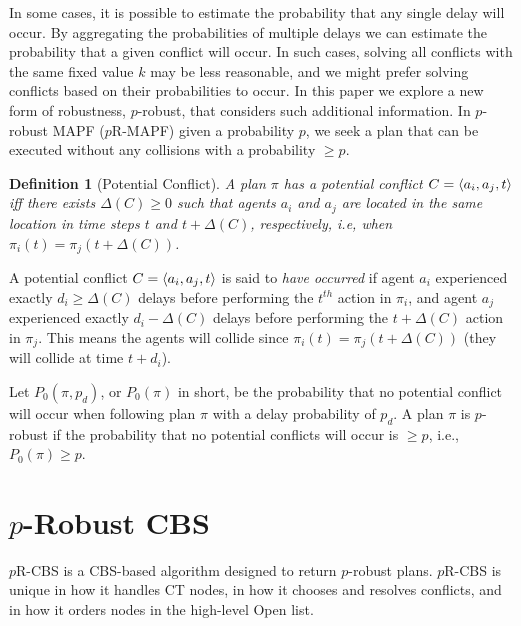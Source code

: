 \documentclass{article}
\newcommand{\prcbs}{$p$R-CBS\xspace}
\newcommand{\prmapf}{$p$R-MAPF\xspace}
\newtheorem{definition}{Definition}
\begin{document}
In some cases, it is possible to estimate the probability that any single delay will occur. By aggregating the probabilities of multiple delays we can estimate the probability that a given conflict will occur. In such cases, solving all conflicts with the same fixed value $k$ may be less reasonable, and we might prefer solving conflicts based on their probabilities to occur. In this paper we explore a new form of robustness, $p$-robust, that considers such additional information. In $p$-robust MAPF (\prmapf) given a probability $p$, we seek a plan that can be executed without any collisions with a probability $\geq p$. 

\begin{definition}[Potential Conflict]
A plan $\pi$ has a potential conflict $C=\left \langle a_i,a_j,t \right \rangle $ iff there exists $\Delta(C)\geq 0$ such that agents $a_i$ and $a_j$ are located in the same location in time steps $t$ and $t+\Delta(C)$, respectively, i.e, when $\pi_i(t) = \pi_j(t+\Delta(C))$.  
\end{definition}

A potential conflict $C=\left \langle a_i,a_j,t \right \rangle $ 
is said to {\em have occurred} if agent $a_i$ experienced exactly $d_i\geq \Delta(C)$ delays before performing the $t^{th}$ action in $\pi_i$, 
and agent $a_j$ experienced exactly $d_i-\Delta(C)$ delays before performing the $t+\Delta(C)$ action in $\pi_j$. This means the agents will collide  since $\pi_i(t)=\pi_j(t+\Delta(C))$ (they will collide at time $t+d_i$).
 
Let $P_0(\pi,p_d)$, or $P_0(\pi)$ in short, be the probability that no potential conflict will occur when following plan $\pi$ with a delay probability of $p_d$. 
A plan $\pi$ is $p$-robust if the probability that no potential conflicts will occur is $\geq p$, i.e., $P_0(\pi)\geq p$.

\section{\texorpdfstring{$p$}--Robust CBS}
 \label{sec:probust-cbs}
 
\prcbs is a CBS-based algorithm \cite{CBSJUR} designed to return $p$-robust plans.  \prcbs{} is unique in how it handles CT nodes, in how it chooses and resolves conflicts, and in how it orders nodes in the high-level Open list. 
\end{document}
